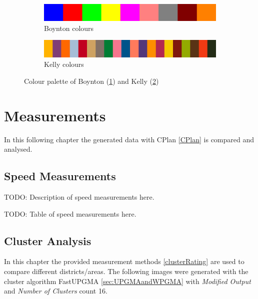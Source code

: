 \documentclass[11pt, a4paper]{report}
\begin{document}
\begin{figure}
    \centering
    \begin{subfigure}[b]{\textwidth}
        \begin{mdframed}[style=mdthight]
            \includegraphics[width=\linewidth]{boynton_colours.png}
        \end{mdframed}
        \caption{Boynton colours}
        \label{fig:boynton_colours}
    \end{subfigure}
    \par\medskip
    \begin{subfigure}[b]{\textwidth}
        \begin{mdframed}[style=mdthight]
            \includegraphics[width=\linewidth]{kelly_colours.png}
        \end{mdframed}
        \caption{Kelly colours}
        \label{fig:kelly_colurs}
    \end{subfigure}
    \caption{Colour palette of Boynton (\ref{fig:boynton_colours}) and Kelly (\ref{fig:kelly_colurs})}
    \label{fig:colours}
\end{figure}

\chapter{Measurements}
\label{sec:measurements}
In this following chapter the generated data with CPlan \ref{CPlan} is compared and analysed. 
\section{Speed Measurements}
\label{sec:measurements-speed}
TODO: Description of speed measurements here. 

TODO: Table of speed measurements here.

\section{Cluster Analysis}
\label{sec:measurements-cluster-analysis}
In this chapter the provided measurement methods \ref{clusterRating} are used to compare different districts/areas. The following images were generated with the cluster algorithm FastUPGMA \ref{sec:UPGMAandWPGMA} with \textit{Modified Output} and \textit{Number of Clusters} count 16. 
\end{document}
